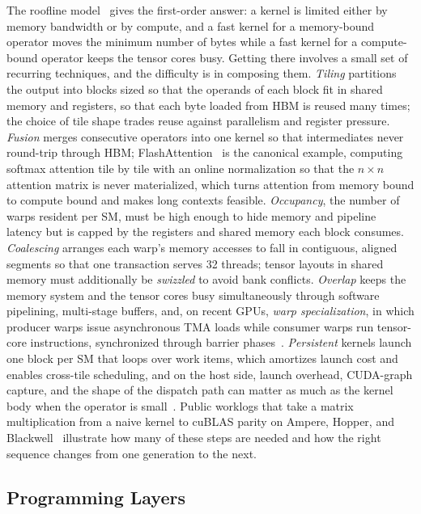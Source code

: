 The roofline model~\cite{williams2009roofline} gives the first-order answer: a kernel is limited either by memory bandwidth or by compute, and a fast kernel for a memory-bound operator moves the minimum number of bytes while a fast kernel for a compute-bound operator keeps the tensor cores busy.
Getting there involves a small set of recurring techniques, and the difficulty is in composing them.
\emph{Tiling} partitions the output into blocks sized so that the operands of each block fit in shared memory and registers, so that each byte loaded from HBM is reused many times; the choice of tile shape trades reuse against parallelism and register pressure.
\emph{Fusion} merges consecutive operators into one kernel so that intermediates never round-trip through HBM; FlashAttention~\cite{flashattention} is the canonical example, computing softmax attention tile by tile with an online normalization so that the $n \times n$ attention matrix is never materialized, which turns attention from memory bound to compute bound and makes long contexts feasible.
\emph{Occupancy}, the number of warps resident per SM, must be high enough to hide memory and pipeline latency but is capped by the registers and shared memory each block consumes.
\emph{Coalescing} arranges each warp's memory accesses to fall in contiguous, aligned segments so that one transaction serves 32 threads; tensor layouts in shared memory must additionally be \emph{swizzled} to avoid bank conflicts.
\emph{Overlap} keeps the memory system and the tensor cores busy simultaneously through software pipelining, multi-stage buffers, and, on recent GPUs, \emph{warp specialization}, in which producer warps issue asynchronous TMA loads while consumer warps run tensor-core instructions, synchronized through barrier phases~\cite{shah2024flashattention3}.
\emph{Persistent} kernels launch one block per SM that loops over work items, which amortizes launch cost and enables cross-tile scheduling, and on the host side, launch overhead, CUDA-graph capture, and the shape of the dispatch path can matter as much as the kernel body when the operator is small~\cite{hu2024korch,jin2026eventtensor}.
Public worklogs that take a matrix multiplication from a naive kernel to cuBLAS parity on Ampere, Hopper, and Blackwell~\cite{boehm2022cudammm,shankhdhar2024h100,modular2025blackwell} illustrate how many of these steps are needed and how the right sequence changes from one generation to the next.

\subsection{Programming Layers}
\label{background:subsec:programming_layers}

